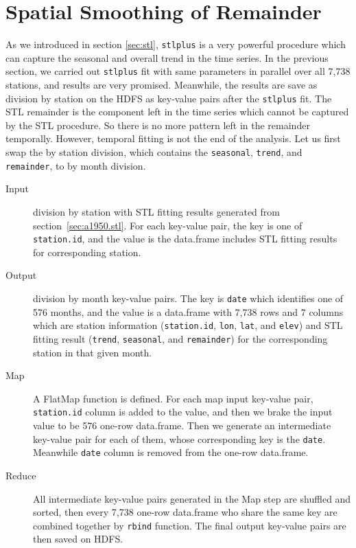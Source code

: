 \section{Spatial Smoothing of Remainder}
\label{sec:a1950.spafit}

As we introduced in section \ref{sec:stl}, \texttt{stlplus} is a very powerful 
procedure which can capture the seasonal and overall trend in the time series. 
In the previous section, we carried out \texttt{stlplus} fit with same parameters 
in parallel over all 7,738 stations, and results are very promised. Meanwhile, 
the results are save as division by station on the HDFS as key-value pairs after
the \texttt{stlplus} fit. The STL remainder is the component left in the time
series which cannot be captured by the STL procedure. So there is no more pattern
left in the remainder temporally. However, temporal fitting is not the end of
the analysis. Let us first swap the by station division, which contains the 
\texttt{seasonal}, \texttt{trend}, and \texttt{remainder}, to by month division. 

\begin{description}
  \item[Input] division by station with STL fitting results generated from 
  section~\ref{sec:a1950.stl}. For each key-value pair, the key is one of 
  \texttt{station.id}, and the value is the data.frame includes STL fitting 
  results for corresponding station.
  \item[Output] division by month key-value pairs. The key is \texttt{date} which 
  identifies one of 576 months, and the value is a data.frame with 7,738 rows and 
  7 columns which are station information (\texttt{station.id}, \texttt{lon}, 
  \texttt{lat}, and \texttt{elev}) 
  and STL fitting result (\texttt{trend}, \texttt{seasonal}, and 
  \texttt{remainder}) for the corresponding station in that given month.
  \item[Map] A FlatMap function is defined. For each map input key-value pair, 
  \texttt{station.id} column is added to the value, and then we brake the input 
  value to be 576 one-row data.frame. Then we generate an intermediate key-value 
  pair for each of them, whose corresponding key is the \texttt{date}. Meanwhile 
  \texttt{date} column is removed from the one-row data.frame.   
  \item[Reduce] All intermediate key-value pairs generated in the Map step are 
  shuffled and sorted, then every 7,738 one-row data.frame who share the same 
  key are combined together by \texttt{rbind} function. The final output key-value
  pairs are then saved on HDFS.
\end{description}

